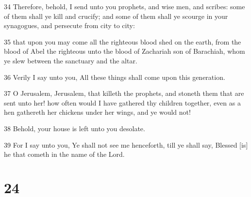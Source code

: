 \par 34 Therefore, behold, I send unto you prophets, and wise men, and scribes: some of them shall ye kill and crucify; and some of them shall ye scourge in your synagogues, and persecute from city to city:
\par 35 that upon you may come all the righteous blood shed on the earth, from the blood of Abel the righteous unto the blood of Zachariah son of Barachiah, whom ye slew between the sanctuary and the altar.
\par 36 Verily I say unto you, All these things shall come upon this generation.
\par 37 O Jerusalem, Jerusalem, that killeth the prophets, and stoneth them that are sent unto her! how often would I have gathered thy children together, even as a hen gathereth her chickens under her wings, and ye would not!
\par 38 Behold, your house is left unto you desolate.
\par 39 For I say unto you, Ye shall not see me henceforth, till ye shall say, Blessed [is] he that cometh in the name of the Lord.

\chapter{24}

